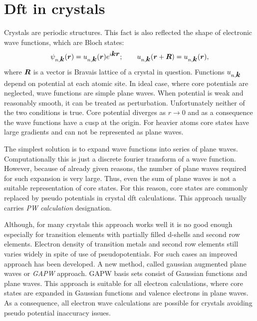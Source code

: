 \message{ !name(document.tex)}\documentclass[openany, longbibliography,slovene,a4paper,12pt]{article}
\def\vec#1{\mbox{\boldmath$#1$}}
\begin{document}
\section{Dft in crystals}
Crystals are periodic structures. This fact is also reflected the shape of
electronic  wave functions, which are Bloch states:
\begin{equation}
  \psi_{n, \vec k}(\vec r) = u_{n, \vec k}(\vec r)e^{i\vec k \vec r};\quad \textrm\quad u_{n,\vec k}(\vec r + \vec R) =  u_{n,\vec k}(\vec r),
\end{equation}
where $\vec R$ is a vector is Bravais lattice of a crystal in question.
Functions $u_{n,\vec k}$ depend on potential at each atomic site.
In ideal case, where core potentials are neglected,
wave functions are simple plane waves. When potential is weak and
reasonably smooth, it can be treated as perturbation. Unfortunately neither of
the two conditions is true. Core potential diverges as $r \rightarrow 0$
and as a consequence the wave functions have a cusp at the origin. For heavier
atoms core states have large gradients and can not be represented as plane waves.

The simplest solution is to expand wave functions into series of plane waves.
Computationally this is just a discrete fourier transform of a wave function.
However, because of already given reasons, the number of plane waves required
for such expansion is very large. Thus, even the sum of plane waves is not a
suitable representation of core states. For this reason, core states are
commonly replaced by pseudo potentials in crystal dft calculations. This
approach usually carries \emph{PW calculation} designation.

Although, for many
crystals this approach works well it is no good enough especially for transition elements with
partially filled d-shells and second row elements. Electron density of transition
metals and second row elements still varies widely in spite of use of
pseudopotentials. For such cases an improved approach has been developed. A new
method, called gaussian augmented plane waves or \emph{GAPW} approach. GAPW
basis sets consist of Gaussian functions and plane waves. This approach is suitable for all electron
calculations, where core states are expanded in Gaussian functions and valence
electrons in plane waves. As a consequence, all electron wave calculations are
possible for crystals avoiding pseudo potential inaccuracy issues.


{}


\end{document}
